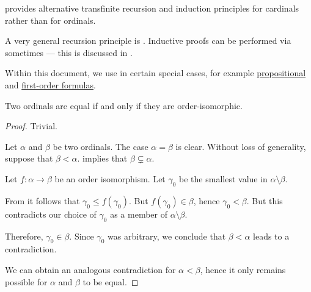 \begin{remark}
\begin{thmenum}
     provides alternative transfinite recursion and induction principles for cardinals rather than for ordinals.

     A very general recursion principle is . Inductive proofs can be performed via  sometimes --- this is discussed in .

    Within this document, we use  in certain special cases, for example \hyperref[def:propositional_syntax/formula]{propositional} and \hyperref[def:first_order_syntax/formula]{first-order formulas}.
  \end{thmenum}
\end{remark}

\begin{proposition}\label{thm:ordinal_isomorphism}
  Two ordinals are equal if and only if they are order-isomorphic.
\end{proposition}
\begin{proof}
  \SufficiencySubProof Trivial.

  \NecessitySubProof Let \( \alpha \) and \( \beta \) be two ordinals. The case \( \alpha = \beta \) is clear. Without loss of generality, suppose that \( \beta < \alpha \).  implies that \( \beta \subsetneq \alpha \).

  Let \( f: \alpha \to \beta \) be an order isomorphism. Let \( \gamma_0 \) be the smallest value in \( \alpha \setminus \beta \).

  From  it follows that \( \gamma_0 \leq f(\gamma_0) \). But \( f(\gamma_0) \in \beta \), hence \( \gamma_0 < \beta \). But this contradicts our choice of \( \gamma_0 \) as a member of \( \alpha \setminus \beta \).

  Therefore, \( \gamma_0 \in \beta \). Since \( \gamma_0 \) was arbitrary, we conclude that \( \beta < \alpha \) leads to a contradiction.

  We can obtain an analogous contradiction for \( \alpha < \beta \), hence it only remains possible for \( \alpha \) and \( \beta \) to be equal.
\end{proof}

